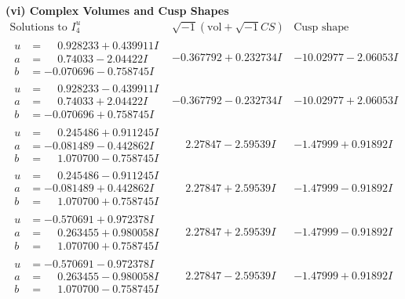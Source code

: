 \documentclass[1p]{elsarticle_modified}
\theoremstyle{definition}
\newcommand{\I}{\sqrt{-1}}
\begin{document}
\newpage\flushleft \textbf{(vi) Complex Volumes and Cusp Shapes}
$$\begin{array}{c|c|c}  
\text{Solutions to }I^u_{4}& \I (\text{vol} + \sqrt{-1}CS) & \text{Cusp shape}\\
 \hline 
\begin{aligned}
u &= \phantom{-}0.928233 + 0.439911 I \\
a &= \phantom{-}0.74033 - 2.04422 I \\
b &= -0.070696 - 0.758745 I\end{aligned}
 & -0.367792 + 0.232734 I & -10.02977 - 2.06053 I \\ \hline\begin{aligned}
u &= \phantom{-}0.928233 - 0.439911 I \\
a &= \phantom{-}0.74033 + 2.04422 I \\
b &= -0.070696 + 0.758745 I\end{aligned}
 & -0.367792 - 0.232734 I & -10.02977 + 2.06053 I \\ \hline\begin{aligned}
u &= \phantom{-}0.245486 + 0.911245 I \\
a &= -0.081489 - 0.442862 I \\
b &= \phantom{-}1.070700 - 0.758745 I\end{aligned}
 & \phantom{-}2.27847 - 2.59539 I & -1.47999 + 0.91892 I \\ \hline\begin{aligned}
u &= \phantom{-}0.245486 - 0.911245 I \\
a &= -0.081489 + 0.442862 I \\
b &= \phantom{-}1.070700 + 0.758745 I\end{aligned}
 & \phantom{-}2.27847 + 2.59539 I & -1.47999 - 0.91892 I \\ \hline\begin{aligned}
u &= -0.570691 + 0.972378 I \\
a &= \phantom{-}0.263455 + 0.980058 I \\
b &= \phantom{-}1.070700 + 0.758745 I\end{aligned}
 & \phantom{-}2.27847 + 2.59539 I & -1.47999 - 0.91892 I \\ \hline\begin{aligned}
u &= -0.570691 - 0.972378 I \\
a &= \phantom{-}0.263455 - 0.980058 I \\
b &= \phantom{-}1.070700 - 0.758745 I\end{aligned}
 & \phantom{-}2.27847 - 2.59539 I & -1.47999 + 0.91892 I \\ \hline\begin{aligned}

\end{aligned}
\end{array}$$
\end{document}
